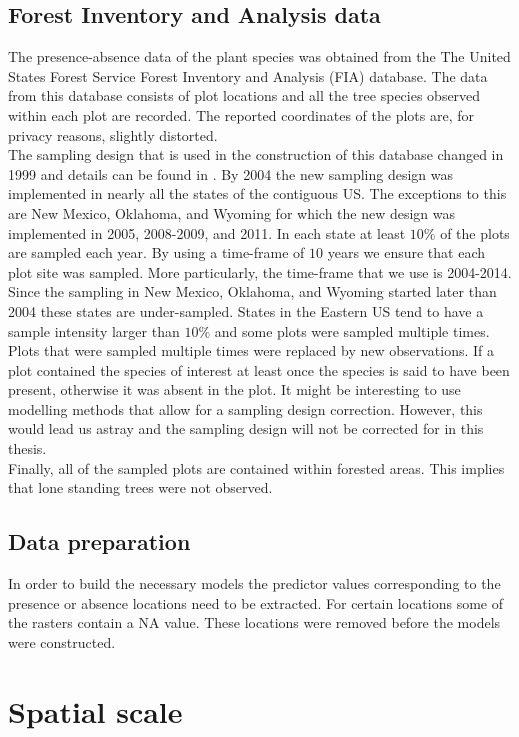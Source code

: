 \subsection{Forest Inventory and Analysis data}
The presence-absence data of the plant species was obtained from the The United States Forest Service Forest Inventory and Analysis (FIA) database. The data from this database consists of plot locations and all the tree species observed within each plot are recorded. The reported coordinates of the plots are, for privacy reasons, slightly distorted.\\ 

The sampling design that is used in the construction of this database changed in 1999 and details can be found in \cite{fiamanual}. By 2004 the new sampling design was implemented in nearly all the states of the contiguous US. The exceptions to this are New Mexico, Oklahoma, and Wyoming for which the new design was implemented in 2005, 2008-2009, and 2011. In each state at least $10\%$ of the plots are sampled each year. By using a time-frame of $10$ years we ensure that each plot site was sampled. More particularly, the time-frame that we use is 2004-2014. Since the sampling in New Mexico, Oklahoma, and Wyoming started later than 2004 these states are under-sampled. States in the Eastern US tend to have a sample intensity larger than $10\%$ and some plots were sampled multiple times. Plots that were sampled multiple times were replaced by new observations. If a plot contained the species of interest at least once the species is said to have been present, otherwise it was absent in the plot. It might be interesting to use modelling methods that allow for a sampling design correction. However, this would lead us astray and the sampling design will not be corrected for in this thesis.\\

Finally, all of the sampled plots are contained within forested areas. This implies that lone standing trees were not observed.

\subsection{Data preparation}
In order to build the necessary models the predictor values corresponding to the presence or absence locations need to be extracted. For certain locations some of the rasters contain a \textsc{NA} value. These locations were removed before the models were constructed.
\section{Spatial scale}
\label{sec:SpatialScale}

